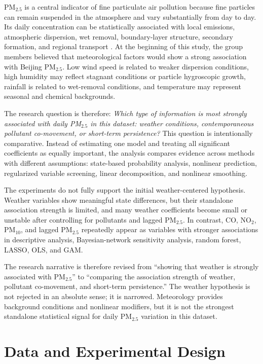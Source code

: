 \documentclass[11pt]{article}
\begin{document}
PM$_{2.5}$ is a central indicator of fine particulate air pollution because fine particles can remain suspended in the atmosphere and vary substantially from day to day. Its daily concentration can be statistically associated with local emissions, atmospheric dispersion, wet removal, boundary-layer structure, secondary formation, and regional transport \cite{who2021,seinfeld2016}. At the beginning of this study, the group members believed that meteorological factors would show a strong association with Beijing PM$_{2.5}$. Low wind speed is related to weaker dispersion conditions, high humidity may reflect stagnant conditions or particle hygroscopic growth, rainfall is related to wet-removal conditions, and temperature may represent seasonal and chemical backgrounds.

The research question is therefore: \emph{Which type of information is most strongly associated with daily PM$_{2.5}$ in this dataset: weather conditions, contemporaneous pollutant co-movement, or short-term persistence?} This question is intentionally comparative. Instead of estimating one model and treating all significant coefficients as equally important, the analysis compares evidence across methods with different assumptions: state-based probability analysis, nonlinear prediction, regularized variable screening, linear decomposition, and nonlinear smoothing.

The experiments do not fully support the initial weather-centered hypothesis. Weather variables show meaningful state differences, but their standalone association strength is limited, and many weather coefficients become small or unstable after controlling for pollutants and lagged PM$_{2.5}$. In contrast, CO, NO$_2$, PM$_{10}$, and lagged PM$_{2.5}$ repeatedly appear as variables with stronger associations in descriptive analysis, Bayesian-network sensitivity analysis, random forest, LASSO, OLS, and GAM.

The research narrative is therefore revised from ``showing that weather is strongly associated with PM$_{2.5}$'' to ``comparing the association strength of weather, pollutant co-movement, and short-term persistence.'' The weather hypothesis is not rejected in an absolute sense; it is narrowed. Meteorology provides background conditions and nonlinear modifiers, but it is not the strongest standalone statistical signal for daily PM$_{2.5}$ variation in this dataset.

\section{Data and Experimental Design}
\end{document}
